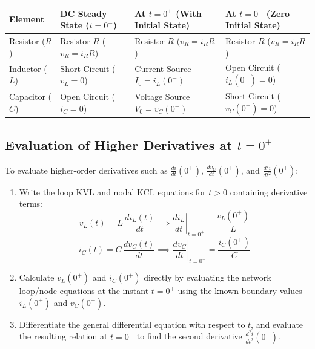 \documentclass[12pt,a4paper]{article}
\renewcommand{\arraystretch}{1.45}
\begin{document}
\par\vspace{6pt}\noindent
\begingroup
\setlength{\tabcolsep}{4.5pt}
\setlength{\extrarowheight}{2.5pt}
\renewcommand{\arraystretch}{1.30}
\begin{tabularx}{\linewidth}{|B{2.2cm}|B{3.4cm}|B{3.8cm}|Y|}
\hline
\textbf{Element} & \textbf{DC Steady State ($t = 0^-$)} & \textbf{At $t = 0^+$ (With Initial State)} & \textbf{At $t = 0^+$ (Zero Initial State)} \\
\hline
Resistor ($R$) & Resistor $R$ ($v_R = i_R R$) & Resistor $R$ ($v_R = i_R R$) & Resistor $R$ ($v_R = i_R R$) \\
\hline
Inductor ($L$) & Short Circuit ($v_L = 0$) & Current Source $I_0 = i_L(0^-)$ & Open Circuit ($i_L(0^+) = 0$) \\
\hline
Capacitor ($C$) & Open Circuit ($i_C = 0$) & Voltage Source $V_0 = v_C(0^-)$ & Short Circuit ($v_C(0^+) = 0$) \\
\hline
\end{tabularx}
\endgroup
\vspace{12pt}

\subsection{Evaluation of Higher Derivatives at $t = 0^+$}

To evaluate higher-order derivatives such as $\frac{di}{dt}(0^+)$, $\frac{dv_C}{dt}(0^+)$, and $\frac{d^2i}{dt^2}(0^+)$:
\begin{enumerate}[leftmargin=*]
  \item Write the loop KVL and nodal KCL equations for $t > 0$ containing derivative terms:
  \begin{equation}
    v_L(t) = L\,\frac{di_L(t)}{dt} \implies \left.\frac{di_L}{dt}\right|_{t=0^+} = \frac{v_L(0^+)}{L}
  \end{equation}
  \begin{equation}
    i_C(t) = C\,\frac{dv_C(t)}{dt} \implies \left.\frac{dv_C}{dt}\right|_{t=0^+} = \frac{i_C(0^+)}{C}
  \end{equation}
  \item Calculate $v_L(0^+)$ and $i_C(0^+)$ directly by evaluating the network loop/node equations at the instant $t = 0^+$ using the known boundary values $i_L(0^+)$ and $v_C(0^+)$.
  \item Differentiate the general differential equation with respect to $t$, and evaluate the resulting relation at $t = 0^+$ to find the second derivative $\frac{d^2i}{dt^2}(0^+)$.
\end{enumerate}
\end{document}
